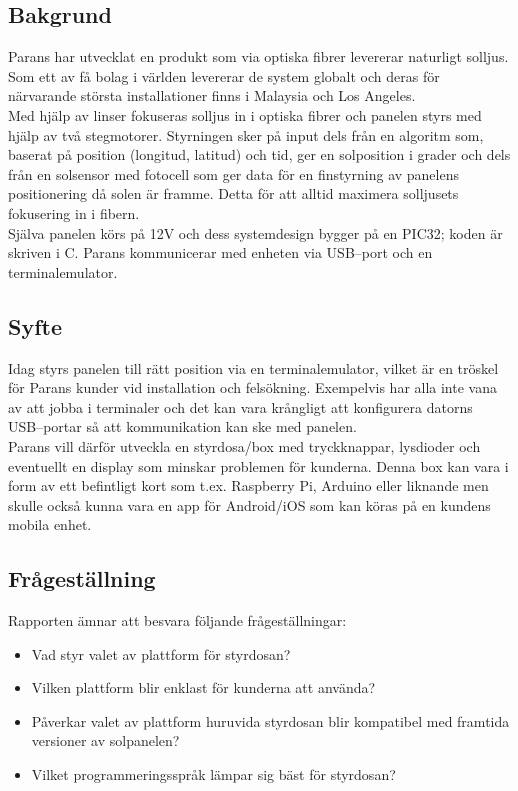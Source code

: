 \documentclass{article}
\begin{document}
        \subsection{Bakgrund} %
        \label{sub:bakgrund}
            Parans har utvecklat en produkt som via optiska fibrer levererar naturligt solljus. Som ett av få bolag i världen levererar de system globalt och deras för närvarande största installationer finns i Malaysia och Los Angeles.\\

            \noindent Med hjälp av linser fokuseras solljus in i optiska fibrer och panelen styrs med hjälp av två stegmotorer. Styrningen sker på input dels från en algoritm som, baserat på position (longitud, latitud) och tid, ger en solposition i grader och dels från en solsensor med fotocell som ger data för en finstyrning av panelens positionering då solen är framme. Detta för att alltid maximera solljusets fokusering in i fibern.\\

            \noindent Själva panelen körs på 12V och dess systemdesign bygger på en PIC32; koden är skriven i C. Parans kommunicerar med enheten via USB--port och en terminalemulator. 
        
        \subsection{Syfte} %
        \label{sub:syfte}
            Idag styrs panelen till rätt position via en terminalemulator, vilket är en tröskel för Parans kunder vid installation och felsökning.  Exempelvis har alla inte vana av att jobba i terminaler och det kan vara krångligt att konfigurera datorns USB--portar så att kommunikation kan ske med panelen. \\

            \noindent Parans vill därför utveckla en styrdosa/box med tryckknappar, lysdioder och eventuellt en display som minskar problemen för kunderna. Denna box kan vara i form av ett befintligt kort som t.ex. Raspberry Pi, Arduino eller liknande men skulle också kunna vara en app för Android/iOS som kan köras på en kundens mobila enhet.

        \subsection{Frågeställning} %
        \label{sub:fragestallning}
        Rapporten ämnar att besvara följande frågeställningar:
        \begin{itemize}
            \item Vad styr valet av plattform för styrdosan?
            \item Vilken plattform blir enklast för kunderna att använda?
            \item Påverkar valet av plattform huruvida styrdosan blir kompatibel med framtida versioner av solpanelen?
            \item Vilket programmeringsspråk lämpar sig bäst för styrdosan?
        \end{itemize}   
        
\end{document}
